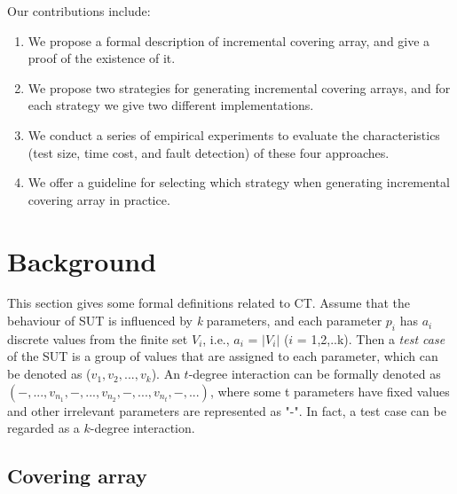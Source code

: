 \documentclass[conference]{IEEEtran}
\theoremstyle{definition}
\begin{document}
%
%
%
%
Our contributions include:

 \begin{enumerate}
 \item  We propose a formal description of incremental covering array, and give a proof of the existence of it.
 \item  We propose two strategies for generating incremental covering arrays, and for each strategy we give two different implementations.
 \item  We conduct a series of empirical experiments to evaluate the characteristics (test size, time cost, and fault detection) of these four approaches.
 \item  We offer a guideline for selecting which strategy when generating incremental covering array in practice.
\end{enumerate}
%

\section{Background}
This section gives some formal definitions related to CT. Assume that the behaviour of SUT is influenced by \emph{k} parameters, and each parameter $p_{i}$ has $a_{i}$ discrete values from the finite set $V_{i}$, i.e., $a_{i}$ = $|V_{i}|$ ($i$ = 1,2,..k). Then a \emph{test case} of the SUT is a group of values that are assigned to each parameter, which can be denoted as ($v_{1}, v_{2}, ..., v_{k}$). An $t$-degree interaction can be formally denoted as $(-, ..., v_{n_{1}}, -, ..., v_{n_{2}},-, ...,v_{n_{t}}, -, ...)$, where some t parameters have fixed values and other irrelevant parameters are represented as "-". In fact, a test case can be regarded as a $k$-degree interaction.


\subsection{Covering array}
\end{document}
